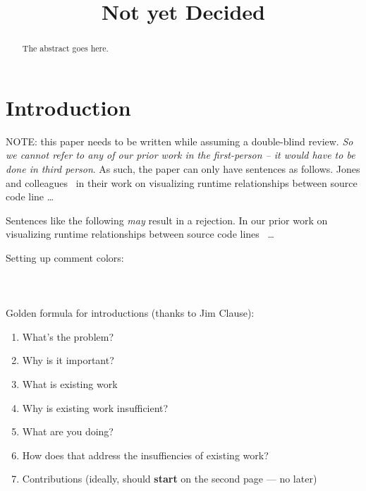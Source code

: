 \documentclass[conference]{IEEEtran}
\begin{document}
\title{Not yet Decided}

\author{
}

\maketitle


\begin{abstract}
The abstract goes here.\\
\end{abstract}



\section{Introduction}

NOTE: this paper needs to be written while assuming a double-blind review. \emph{So we cannot refer to any of our prior work in the first-person -- it would have to be done in third person}. As such, the paper can only have sentences as follows. Jones and colleagues~\cite{palepu13sep,palepu2015revealing,deng11sep} in their work on visualizing runtime relationships between source code line \ldots

Sentences like the following \emph{may} result in a rejection. In our prior work on visualizing runtime relationships between source code lines~\cite{palepu13sep,palepu2015revealing,deng11sep} \ldots

Setting up comment colors:\\ 
\\
\\
\\

Golden formula for introductions (thanks to Jim Clause):
\begin{enumerate}
\item What's the problem?
\item Why is it important?
\item What is existing work
\item Why is existing work insufficient?
\item What are you doing?
\item How does that address the insuffiencies of existing work?
\item Contributions (ideally, should \textbf{start} on the second page --- no later)
\end{enumerate}
\end{document}
